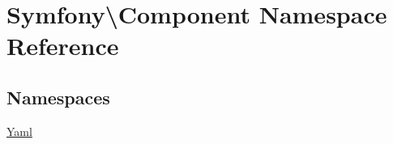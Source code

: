 \hypertarget{namespace_symfony_1_1_component}{}\section{Symfony\textbackslash{}Component Namespace Reference}
\label{namespace_symfony_1_1_component}
\subsection*{Namespaces}
\begin{DoxyCompactItemize}
\item 
 \mbox{\hyperlink{namespace_symfony_1_1_component_1_1_yaml}{Yaml}}
\end{DoxyCompactItemize}
